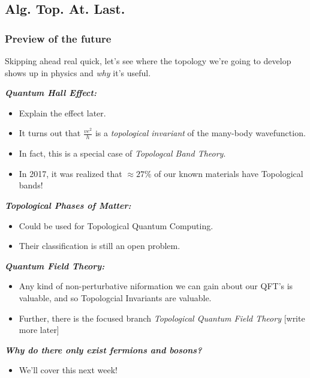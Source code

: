 \documentclass{article}
\begin{document}
\subsection{Alg. Top. At. Last.}

\subsubsection*{Preview of the future}
Skipping ahead real quick, let's see where the topology we're going to develop shows up in physics and \emph{why} it's useful.

\begin{dottedbox}
  \emph{\textbf{Quantum Hall Effect:}} 
  \begin{itemize}
    \item Explain the effect later.
    \item It turns out that $\frac{ve^2}{h}$ is a \emph{topological invariant} of the many-body wavefunction. 
    \item In fact, this is a special case of \emph{Topologcal Band Theory}.
    \item In 2017, it was realized that $\approx 27 \%$ of our known materials have Topological bands!
  \end{itemize}
\end{dottedbox}

\begin{dottedbox}
  \emph{\textbf{Topological Phases of Matter:}} 
  \begin{itemize}
    \item Could be used for Topological Quantum Computing.
    \item Their classification is still an open problem.
  \end{itemize}
\end{dottedbox}

\begin{dottedbox}
  \emph{\textbf{Quantum Field Theory:}} 
  \begin{itemize}
    \item Any kind of non-perturbative niformation we can gain about our QFT's is valuable, and so Topologcial Invariants are valuable.
    \item Further, there is the focused branch \emph{Topological Quantum Field Theory} [write more later]
  \end{itemize}
\end{dottedbox}
\begin{dottedbox}
  \emph{\textbf{Why do there only exist fermions and bosons?}} 
  \begin{itemize}
    \item We'll cover this next week!
  \end{itemize}
\end{dottedbox}
\end{document}
